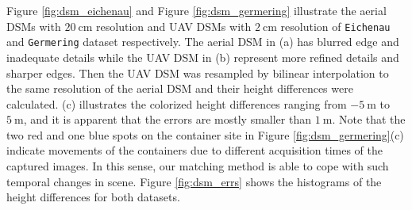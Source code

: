 Figure \ref{fig:dsm_eichenau} and Figure \ref{fig:dsm_germering} illustrate the aerial DSMs with $\SI{20}{\cm}$ resolution and UAV DSMs with $\SI{2}{\cm}$ resolution of \texttt{Eichenau} and \texttt{Germering} dataset respectively. The aerial DSM in (a) has blurred edge and inadequate details while the UAV DSM in (b) represent more refined details and sharper edges.
Then the UAV DSM was resampled by bilinear interpolation to the same resolution of the aerial DSM and their height differences were calculated.
(c) illustrates the colorized height differences ranging from $\SI{-5}{\m}$ to $\SI{5}{\m}$, and it is apparent that the errors are mostly smaller than $\SI{1}{\m}$.
Note that the two red and one blue spots on the container site in Figure \ref{fig:dsm_germering}(c) indicate movements of the containers due to different acquisition times of the captured images.
In this sense, our matching method is able to cope with such temporal changes in scene.
Figure \ref{fig:dsm_errs} shows the histograms of the height differences for both datasets.

